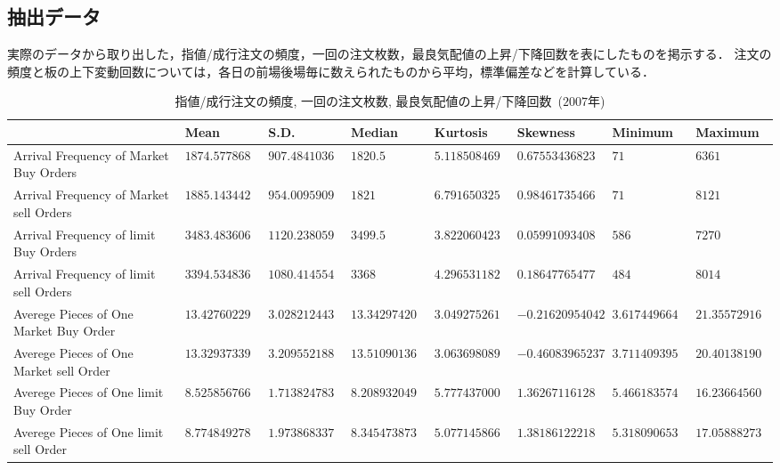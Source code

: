 \documentclass[a4j,papersize,disablejfam,slide,14pt]{jsarticle}
\newcommand{\bhline}[1]{\noalign {\hrule height #1}} %
\begin{document}
\subsection{抽出データ}
    実際のデータから取り出した，指値/成行注文の頻度，一回の注文枚数，最良気配値の上昇/下降回数を表にしたものを掲示する．
    注文の頻度と板の上下変動回数については，各日の前場後場毎に数えられたものから平均，標準偏差などを計算している．
    \begin{table}[H]
    	\centering
        \caption{指値/成行注文の頻度, 一回の注文枚数, 最良気配値の上昇/下降回数\ ($2007$年)}
        \fontsize{6pt}\selectfont
    	\begin{tabularx}{\linewidth}{l||lllllll} \bhline{1.5pt}
        \label{tb:statistics_parameters}
        	 & {\rm Mean} & {\rm S.D.} & {\rm Median} & {\rm Kurtosis} & {\rm Skewness} & {\rm Minimum} & {\rm Maximum} \\ \hline \hline
			{\rm Arrival Frequency of Market Buy Orders} & $1874.57786885246$ & $907.484103685263$ & $1820.5$ & $5.1185084691139$ & $0.675534368239935$ & $71$ & $6361$ \\ \hline
			{\rm Arrival Frequency of Market sell Orders} & $1885.14344262295$ & $954.009590995031$ & $1821$ & $6.79165032585533$ & $0.984617354667294$ & $71$ & $8121$ \\ \hline
			{\rm Arrival Frequency of limit Buy Orders} & $3483.48360655738$ & $1120.23805942858$ & $3499.5$ & $3.82206042384918$ & $0.0599109340880956$ & $586$ & $7270$ \\ \hline
			{\rm Arrival Frequency of limit sell Orders} & $3394.53483606557$ & $1080.4145540672$ & $3368$ & $4.29653118280392$ & $0.18647765477941$ & $484$ & $8014$ \\ \hline
			{\rm Averege Pieces of One Market Buy Order} & $13.4276022948203$ & $3.02821244393427$ & $13.3429742057251$ & $3.04927526108989$ & $-0.216209540427003$ & $3.61744966442953$ & $21.3557291666667$ \\ \hline
			{\rm Averege Pieces of One Market sell Order} & $13.3293733928831$ & $3.20955218830292$ & $13.5109013640969$ & $3.06369808944509$ & $-0.460839652375353$ & $3.71140939597315$ & $20.4013819095477$ \\ \hline
			{\rm Averege Pieces of One limit Buy Order} & $8.52585676649367$ & $1.71382478337069$ & $8.20893204942981$ & $5.77743700031615$ & $1.36267116128345$ & $5.46618357487923$ & $16.2366456059736$ \\ \hline
			{\rm Averege Pieces of One limit sell Order} & $8.77484927828575$ & $1.97386833754685$ & $8.34547387331226$ & $5.07714586629268$ & $1.38186122218224$ & $5.31809065383073$ & $17.0588827377957$ \\ \hline

\end{tabularx}
\end{table}
\end{document}
